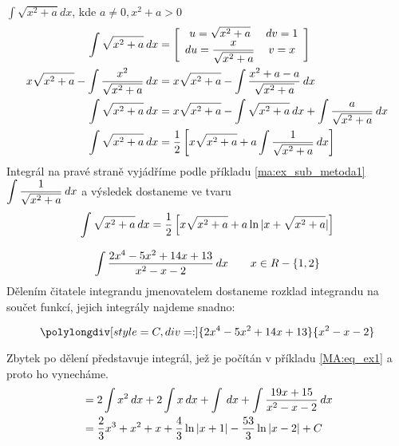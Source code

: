   \begin{example}$\displaystyle\int{\sqrt{x^2+a}dx}$, kde $a\neq0, x^2+a>0$
    \begin{align*}
      \int{\sqrt{x^2+a}\hspace{2pt}dx}                           &=
        \left[
          \begin{array}{cc} 
             u =\sqrt{x^2+a}              & dv = 1 \\ 
            du =\displaystyle
                  \frac{x}{\sqrt{x^2+a}}  &  v = x
          \end{array}
        \right]                                                                                   \\
      x\sqrt{x^2+a}-\int{\frac{x^2}{\sqrt{x^2+a}}\hspace{2pt}dx} &= 
        \displaystyle{x\sqrt{x^2+a}-\int{\frac{x^2+a-a}{\sqrt{x^2+a}}\hspace{2pt}dx}}                        \\
      \int{\sqrt{x^2+a}\hspace{2pt}dx}                           &= 
        \displaystyle{x\sqrt{x^2+a}-\int{\sqrt{x^2+a}\hspace{2pt}dx} + \int{\frac{a}{\sqrt{x^2+a}}\hspace{2pt}dx}}      \\
      \int{\sqrt{x^2+a}\hspace{2pt}dx}                           &= 
        \frac{1}{2}\left[x\sqrt{x^2+a}+a\int{\frac{1}{\sqrt{x^2+a}}}\hspace{2pt}dx\right]
    \end{align*}
    Integrál na pravé straně vyjádříme podle příkladu \ref{ma:ex_sub_metoda1}
    $\displaystyle{\int{\frac{1}{\sqrt{x^2+a}}\hspace{2pt}dx}}$ a výsledek do\-sta\-ne\-me ve tvaru
    $$\int\displaystyle{{\sqrt{x^2+a}\hspace{2pt}dx}=\frac{1}{2}\left[x\sqrt{x^2+a}+a\ln{|x +
    \sqrt{x^2+a}|}\right]}$$
  \end{example}
  
  \begin{example}
    \begin{equation}\label{MA:int_ex_02}
      \int{\frac{2x^4-5x^2+14x+13}{x^2-x-2}\hspace{2pt}dx} \qquad x\in R - \{1,2\}
    \end{equation}
    Dělením čitatele integrandu jmenovatelem dostaneme rozklad integrandu na součet funkcí, jejich integrály 
    najdeme snadno:
    \begin{widetext}
      \begin{equation*}
        \polylongdiv[style=C,div=:]{2x^4-5x^2+14x+13}{x^2-x-2}
      \end{equation*}
    \end{widetext}
    Zbytek po dělení představuje integrál, jež je počítán v příkladu \ref{MA:eq_ex1} a proto ho vynecháme.
    \begin{align*}
       &= 2\int x^2\hspace{2pt}dx + 2\int x\hspace{2pt}dx + \int\hspace{2pt}dx + \int\frac{19x+15}{x^2-x-2}\hspace{2pt}dx     \\
       &= \frac{2}{3}x^3 + x^2 + x + \frac{4}{3}\ln|x+1| - \frac{53}{3}\ln|x-2| + C 
    \end{align*}                
  \end{example}